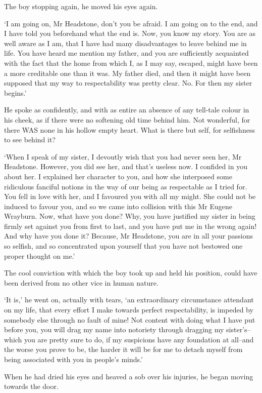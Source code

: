 The boy stopping again, he moved his eyes again.

‘I am going on, Mr Headstone, don’t you be afraid. I am going on to the
end, and I have told you beforehand what the end is. Now, you know my
story. You are as well aware as I am, that I have had many disadvantages
to leave behind me in life. You have heard me mention my father, and you
are sufficiently acquainted with the fact that the home from which I, as
I may say, escaped, might have been a more creditable one than it was.
My father died, and then it might have been supposed that my way to
respectability was pretty clear. No. For then my sister begins.’

He spoke as confidently, and with as entire an absence of any tell-tale
colour in his cheek, as if there were no softening old time behind him.
Not wonderful, for there WAS none in his hollow empty heart. What is
there but self, for selfishness to see behind it?

‘When I speak of my sister, I devoutly wish that you had never seen
her, Mr Headstone. However, you did see her, and that’s useless now. I
confided in you about her. I explained her character to you, and how she
interposed some ridiculous fanciful notions in the way of our being as
respectable as I tried for. You fell in love with her, and I favoured
you with all my might. She could not be induced to favour you, and so
we came into collision with this Mr Eugene Wrayburn. Now, what have you
done? Why, you have justified my sister in being firmly set against you
from first to last, and you have put me in the wrong again! And why
have you done it? Because, Mr Headstone, you are in all your passions
so selfish, and so concentrated upon yourself that you have not bestowed
one proper thought on me.’

The cool conviction with which the boy took up and held his position,
could have been derived from no other vice in human nature.

‘It is,’ he went on, actually with tears, ‘an extraordinary circumstance
attendant on my life, that every effort I make towards perfect
respectability, is impeded by somebody else through no fault of mine!
Not content with doing what I have put before you, you will drag my name
into notoriety through dragging my sister’s--which you are pretty sure
to do, if my suspicions have any foundation at all--and the worse you
prove to be, the harder it will be for me to detach myself from being
associated with you in people’s minds.’

When he had dried his eyes and heaved a sob over his injuries, he began
moving towards the door.

